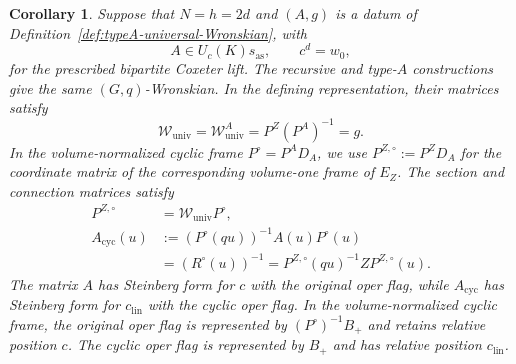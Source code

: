\documentclass[11pt,leqno]{amsart}
\numberwithin{equation}{section}
\theoremstyle{plain}
\newtheorem{corollary}[theorem]{Corollary}
\theoremstyle{definition}
\theoremstyle{plain}
\theoremstyle{definition}
\theoremstyle{remark}
\begin{document}
\begin{corollary}\label{cor:typeA-even-Coxeter-comparison}
Suppose that $N=h=2d$ and $(A,g)$ is a datum of Definition~\ref{def:typeA-universal-Wronskian}, with
\[
 A\in U_c(K)s_{\mathrm{as}},\qquad c^d=w_0,
\]
for the prescribed bipartite Coxeter lift. The recursive and type-$A$ constructions give the same $(G,q)$-Wronskian. In the defining representation, their matrices satisfy
\begin{equation}\label{eq:typeA-even-Coxeter-exact-comparison}
 \mathscr W_{\mathrm{univ}}
 =\mathscr W_{\mathrm{univ}}^A
 =P^Z(P^A)^{-1}=g.
\end{equation}
In the volume-normalized cyclic frame $P^\circ=P^AD_A$, we use $P^{Z,\circ}:=P^ZD_A$ for the coordinate matrix of the corresponding volume-one frame of $E_Z$. The section and connection matrices satisfy
\begin{equation}\label{eq:typeA-finite-frame-qgauge}
 \begin{aligned}
 P^{Z,\circ}&=\mathscr W_{\mathrm{univ}}P^\circ,\\
 A_{\mathrm{cyc}}(u)
 &:=(P^\circ(qu))^{-1}A(u)P^\circ(u)\\
 &=(R^\circ(u))^{-1}
 =P^{Z,\circ}(qu)^{-1}ZP^{Z,\circ}(u).
 \end{aligned}
\end{equation}
The matrix $A$ has Steinberg form for $c$ with the original oper flag, while $A_{\mathrm{cyc}}$ has Steinberg form for $c_{\mathrm{lin}}$ with the cyclic oper flag. In the volume-normalized cyclic frame, the original oper flag is represented by $(P^\circ)^{-1}B_+$ and retains relative position $c$. The cyclic oper flag is represented by $B_+$ and has relative position $c_{\mathrm{lin}}$.
\end{corollary}
\end{document}
